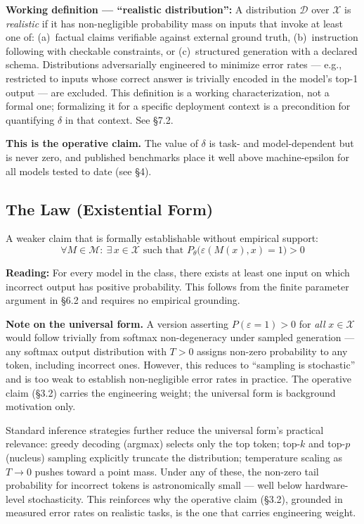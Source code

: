 \documentclass[11pt,a4paper]{article}
\begin{document}
\begin{notebox}
\textbf{Working definition --- ``realistic distribution'':} A distribution $\mathcal{D}$ over $\mathcal{X}$ is \emph{realistic} if it has non-negligible probability mass on inputs that invoke at least one of: (a)~factual claims verifiable against external ground truth, (b)~instruction following with checkable constraints, or (c)~structured generation with a declared schema. Distributions adversarially engineered to minimize error rates --- e.g., restricted to inputs whose correct answer is trivially encoded in the model's top-1 output --- are excluded. This definition is a working characterization, not a formal one; formalizing it for a specific deployment context is a precondition for quantifying $\delta$ in that context. See \S7.2.
\end{notebox}

\textbf{This is the operative claim.} The value of $\delta$ is task- and model-dependent but is never zero, and published benchmarks place it well above machine-epsilon for all models tested to date (see \S4).

\subsection{The Law (Existential Form)}

A weaker claim that is formally establishable without empirical support:
\begin{equation}
\forall M \in \mathcal{M}:\ \exists\, x \in \mathcal{X}
\text{ such that } P_\theta\!\bigl(\varepsilon(M(x), x) = 1\bigr) > 0
\end{equation}

\textbf{Reading:} For every model in the class, there exists at least one input on which incorrect output has positive probability. This follows from the finite parameter argument in \S6.2 and requires no empirical grounding.

\begin{notebox}
\textbf{Note on the universal form.} A version asserting $P(\varepsilon = 1) > 0$ for \emph{all} $x \in \mathcal{X}$ would follow trivially from softmax non-degeneracy under sampled generation --- any softmax output distribution with $T > 0$ assigns non-zero probability to any token, including incorrect ones. However, this reduces to ``sampling is stochastic'' and is too weak to establish non-negligible error rates in practice. The operative claim (\S3.2) carries the engineering weight; the universal form is background motivation only.

Standard inference strategies further reduce the universal form's practical relevance: greedy decoding (argmax) selects only the top token; top-$k$ and top-$p$ (nucleus) sampling explicitly truncate the distribution; temperature scaling as $T \to 0$ pushes toward a point mass. Under any of these, the non-zero tail probability for incorrect tokens is astronomically small --- well below hardware-level stochasticity. This reinforces why the operative claim (\S3.2), grounded in measured error rates on realistic tasks, is the one that carries engineering weight.
\end{notebox}
\end{document}
